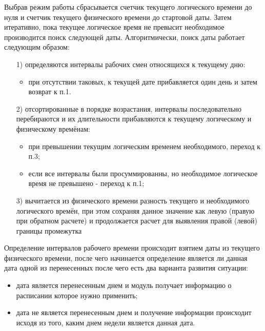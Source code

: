 \indent Выбрав режим работы сбрасывается счетчик текущего логического времени до нуля и счетчик текущего физического времени до стартовой даты. Затем итеративно, пока текущее логическое время не превысит необходимое производится поиск следующей даты.
Алгоритмически, поиск даты работает следующим образом:
\begin{enumerate}
	\item[1)] определяются интервалы рабочих смен относящихся к текущему дню:
	      \begin{itemize}
		      \item при отсутствии таковых, к текущей дате прибавляется один день и затем возврат к п.1.
	      \end{itemize}
	\item[2)] отсортированные в порядке возрастания, интервалы последовательно перебираются и их длительности прибавляются к текущему логическому и физическому времёнам:
	      \begin{itemize}
		      \item при превышении текущим логическим временем необходимого, переход к п.3;
		      \item если все интервалы были просуммированны, но необходимое логическое время не превышено - переход к п.1;
	      \end{itemize}
	\item[3)] вычитается из физического времени разность текущего и необходимого логического времён, при этом сохраняя данное значение как левую (правую при обратном расчете) и продолжается расчет для выявления правой (левой) границы промежутка
\end{enumerate}
\indent Определение интервалов рабочего времени происходит взятием даты из текущего физического времени, после чего начинается определение является ли данная дата одной из перенесенных после чего есть два варианта развития ситуации:
\begin{itemize}
	\item дата является перенесенным днем и модуль получает информацию о расписании которое нужно применить;
	\item дата не является перенесенным днем и получение информации происходит исходя из того, каким днем недели является данная дата.
\end{itemize}

